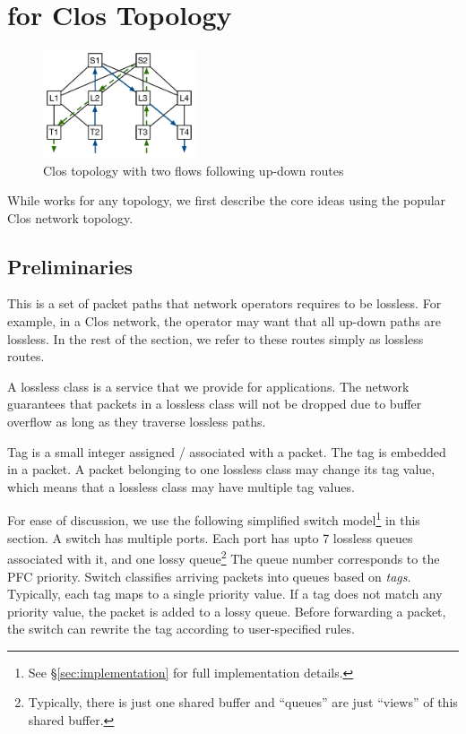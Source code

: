 \section{\sysname{} for Clos Topology}
\label{sec:specific}

\begin{figure}[t]
		\centering
		\includegraphics[width=0.4\textwidth] {figs/updown_paths}
		\caption{Clos topology with two flows following up-down routes}
		\label{fig:basic_clos}
\end{figure}

While \sysname{} works for any topology, we first describe the core ideas using
the popular Clos network topology.

\subsection {Preliminaries}

 This is a set of packet paths that network
operators requires to be lossless. For example, in a Clos network, the
operator may want that all up-down paths are lossless. In the rest of the
section, we refer to these routes simply as lossless routes.

 A lossless class is a service that we provide for
applications. The network guarantees that packets in a lossless class will
not be dropped due to buffer overflow as long as they traverse lossless paths.

 Tag is a small integer assigned / associated with a packet. The tag
is embedded in a packet. A packet belonging to one lossless class may change its
tag value, which means that a lossless class may have multiple tag values.

 For ease of discussion, we use the following simplified
switch model\footnote{See \S\ref{sec:implementation} for full implementation
details.} in this section.  A switch has multiple ports. Each port has upto 7
lossless queues associated with it, and one lossy queue\footnote{Typically,
there is just one shared buffer and ``queues'' are just ``views'' of this shared
buffer.} The queue number corresponds to the PFC priority.  Switch classifies
arriving packets into queues based on {\em tags}.  Typically, each tag maps to a
single priority value. If a tag does not match any priority value, the packet is
added to a lossy queue. Before forwarding a packet, the switch can rewrite the
tag according to user-specified rules.

